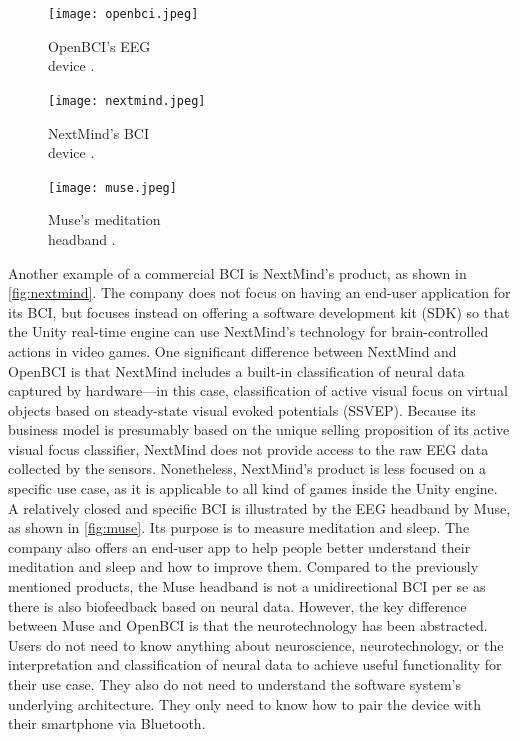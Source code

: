 \begin{figure}[!ht]
  \texttt{[image: openbci.jpeg]}
  \caption[OpenBCI’s EEG device.]{OpenBCI’s EEG \\ device \citep{be_superhvman_conor_2017}.}
  \label{fig:openbci}
  \endminipage\hfill
  \texttt{[image: nextmind.jpeg]}
  \caption[NextMind’s BCI device.]{NextMind’s BCI \\ device \citep{louise_neurotechnology_2019}.}
  \label{fig:nextmind}
  \endminipage\hfill
  \texttt{[image: muse.jpeg]}
  \caption[Muse’s meditation headband.]{Muse’s meditation \\ headband \citep{muse_muse_nodate}.}
  \label{fig:muse}
  \endminipage
\end{figure}

Another example of a commercial BCI is NextMind’s product, as shown in \autoref{fig:nextmind}. The company does not focus on having an end-user application for its BCI, but focuses instead on offering a software development kit (SDK) so that the Unity real-time engine can use NextMind’s technology for brain-controlled actions in video games. One significant difference between NextMind and OpenBCI is that NextMind includes a built-in classification of neural data captured by hardware—in this case, classification of active visual focus on virtual objects based on steady-state visual evoked potentials (SSVEP). Because its business model is presumably based on the unique selling proposition of its active visual focus classifier, NextMind does not provide access to the raw EEG data collected by the sensors. Nonetheless, NextMind’s product is less focused on a specific use case, as it is applicable to all kind of games inside the Unity engine. A relatively closed and specific BCI is illustrated by the EEG headband by Muse, as shown in \autoref{fig:muse}. Its purpose is to measure meditation and sleep. The company also offers an end-user app to help people better understand their meditation and sleep and how to improve them. Compared to the previously mentioned products, the Muse headband is not a unidirectional BCI per se as there is also biofeedback based on neural data. However, the key difference between Muse and OpenBCI is that the neurotechnology has been abstracted. Users do not need to know anything about neuroscience, neurotechnology, or the interpretation and classification of neural data to achieve useful functionality for their use case. They also do not need to understand the software system’s underlying architecture. They only need to know how to pair the device with their smartphone via Bluetooth.

